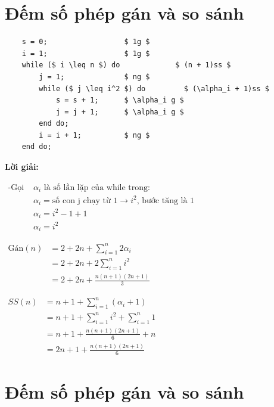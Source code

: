 \documentclass[12pt, letterpaper]{article}
\begin{document}
\section{Đếm số phép gán và so sánh}

\begin{lstlisting}
    s = 0;                  $ 1g $
    i = 1;                  $ 1g $
    while ($ i \leq n $) do             $ (n + 1)ss $
        j = 1;              $ ng $
        while ($ j \leq i^2 $) do         $ (\alpha_i + 1)ss $
            s = s + 1;      $ \alpha_i g $
            j = j + 1;      $ \alpha_i g $
        end do;
        i = i + 1;          $ ng $
    end do;
  \end{lstlisting}
\textbf{Lời giải:}

$ \begin{aligned}
		\text{-Gọi } & \alpha_i \text{ là số lần lặp của while trong:}                              \\
		             & \alpha_i = \text{số con j chạy từ 1} \rightarrow i^2 \text{, bước tăng là 1} \\
		             & \alpha_i = i^2 - 1 + 1                                                       \\
		             & \alpha_i = i^2
	\end{aligned} $


$ \begin{aligned}
		\text{Gán}(n) & = 2 + 2n + \sum^{n}_{i = 1} 2 \alpha_i \\
		              & = 2 + 2n + 2 \sum^{n}_{i = 1} i^2      \\
		              & = 2 + 2n + \frac{n(n + 1)(2n + 1)}{3}
	\end{aligned} $

$ \begin{aligned}
		SS(n) & = n + 1 + \sum^{n}_{i = 1} (\alpha_i + 1)           \\
		      & = n + 1 + \sum^{n}_{i = 1} i^2 + \sum^{n}_{i = 1} 1 \\
		      & = n + 1 + \frac{n(n + 1)(2n + 1)}{6} + n            \\
		      & = 2n + 1 + \frac{n(n + 1)(2n + 1)}{6}
	\end{aligned} $

\section{Đếm số phép gán và so sánh}
\end{document}
